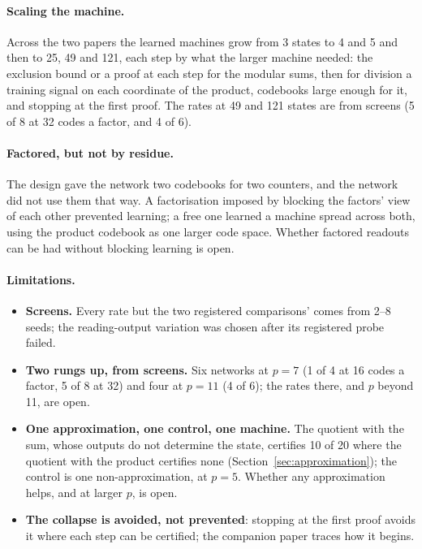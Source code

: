 \documentclass[11pt]{article}
\begin{document}
\paragraph{Scaling the machine.} Across the two papers the learned machines grow from 3 states
to 4 and 5 and then to 25, 49 and 121, each step by what the larger machine needed: the exclusion bound
or a proof at each step for the modular sums, then for division a training signal on each
coordinate of the product, codebooks large enough for it, and stopping at the first proof. The rates
at 49 and 121 states are from screens (5 of 8 at 32 codes a factor, and 4 of 6).

\paragraph{Factored, but not by residue.} The design gave the network two codebooks for two
counters, and the network did not use them that way. A factorisation imposed by blocking the
factors' view of each other prevented learning; a free one learned a machine spread across both,
using the product codebook \citep{jegou-2011-product-quantization-nearest-neighbor} as one larger
code space.
Whether factored readouts can be had without blocking learning is open.

\paragraph{Limitations.}
\begin{itemize}
\item \textbf{Screens.} Every rate but the two registered comparisons' comes from 2--8 seeds; the
  reading-output variation was chosen after its registered probe failed.
\item \textbf{Two rungs up, from screens.} Six networks at $p = 7$ (1 of 4 at 16 codes a factor, 5 of
  8 at 32) and four at $p = 11$ (4 of 6); the rates there, and $p$ beyond 11, are open.
\item \textbf{One approximation, one control, one machine.} The quotient with the sum, whose
  outputs do not determine the state, certifies 10 of 20 where the quotient with the product
  certifies none (Section~\ref{sec:approximation}); the control is one non-approximation, at
  $p = 5$. Whether any approximation helps, and at larger $p$, is open.
\item \textbf{The collapse is avoided, not prevented}: stopping at the first proof avoids it where each
  step can be certified; the companion paper traces how it begins.
\end{itemize}
\end{document}
